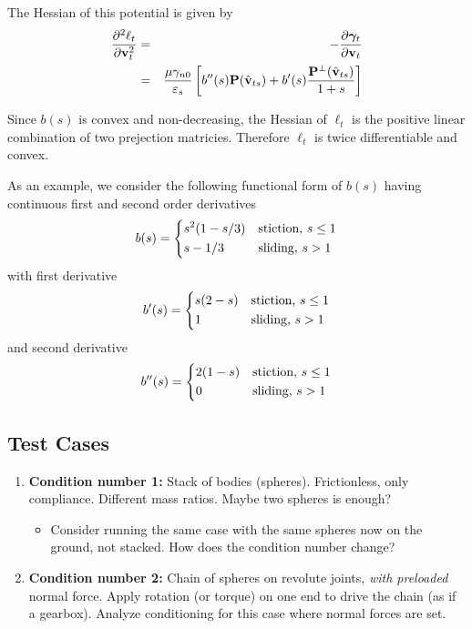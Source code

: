 The Hessian of this potential is given by
\begin{eqnarray}
    \frac{\partial^2\ell_t}{\partial{\mathbf{v}}_t^2}&=&-\frac{\partial{\bm\gamma}_t}{\partial{\mathbf{v}}_t}\nonumber\\
    &=&\frac{\mu\gamma_{n0}}{\varepsilon_s}\left[b''(s){\mathbf{P}}(\hat{{\mathbf{v}}}_{ts})+b'(s)\frac{{\mathbf{P}}^\perp(\hat{{\mathbf{v}}}_{ts})}{1+s}\right]
\end{eqnarray}

Since $b(s)$ is convex and non-decreasing, the Hessian of $\ell_t$ is the
positive linear combination of two prejection matricies. Therefore $\ell_t$ is twice differentiable and convex.

As an example, we consider the following functional form of $b(s)$ having continuous first and second order derivatives
\begin{eqnarray}
    b(s)=\begin{dcases}
        s^2(1-s/3) & \text{stiction, } s \le 1\\        
        s - 1/3 & \text{sliding, } s > 1
    \end{dcases}
\end{eqnarray}
with first derivative
\begin{eqnarray}
    b'(s)=\begin{dcases}
        s(2-s) & \text{stiction, } s \le 1\\        
        1 & \text{sliding, } s > 1
    \end{dcases}
\end{eqnarray}
and second derivative
\begin{eqnarray}
    b''(s)=\begin{dcases}
        2(1-s) & \text{stiction, } s \le 1\\        
        0 & \text{sliding, } s > 1
    \end{dcases}
\end{eqnarray}

\subsection{Test Cases}

\begin{enumerate}
    \item \textbf{Condition number 1:} Stack of bodies (spheres). Frictionless, only
    compliance. Different mass ratios. Maybe two spheres is enough? \begin{itemize}
        \item Consider running the same case with the same spheres now on the
        ground, not stacked. How does the condition number change?
    \end{itemize}
    \item \textbf{Condition number 2:} Chain of spheres on revolute joints, \textit{with
    preloaded} normal force. Apply rotation (or torque) on one end to drive the
    chain (as if a gearbox). Analyze conditioning for this case where normal
    forces are set.
\end{enumerate}

